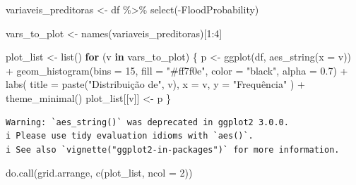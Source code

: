 \documentclass[
  letterpaper,
  DIV=11,
  numbers=noendperiod]{scrartcl}
\newenvironment{Shaded}{\begin{snugshade}}{\end{snugshade}}
\newcommand{\AttributeTok}[1]{\textcolor[rgb]{0.40,0.45,0.13}{#1}}
\newcommand{\ControlFlowTok}[1]{\textcolor[rgb]{0.00,0.23,0.31}{\textbf{#1}}}
\newcommand{\DecValTok}[1]{\textcolor[rgb]{0.68,0.00,0.00}{#1}}
\newcommand{\FloatTok}[1]{\textcolor[rgb]{0.68,0.00,0.00}{#1}}
\newcommand{\FunctionTok}[1]{\textcolor[rgb]{0.28,0.35,0.67}{#1}}
\newcommand{\NormalTok}[1]{\textcolor[rgb]{0.00,0.23,0.31}{#1}}
\newcommand{\OtherTok}[1]{\textcolor[rgb]{0.00,0.23,0.31}{#1}}
\newcommand{\SpecialCharTok}[1]{\textcolor[rgb]{0.37,0.37,0.37}{#1}}
\newcommand{\StringTok}[1]{\textcolor[rgb]{0.13,0.47,0.30}{#1}}
\begin{document}
\begin{Shaded}
\begin{Highlighting}[]
\NormalTok{variaveis\_preditoras }\OtherTok{\textless{}{-}}\NormalTok{ df }\SpecialCharTok{\%\textgreater{}\%} \FunctionTok{select}\NormalTok{(}\SpecialCharTok{{-}}\NormalTok{FloodProbability)}


\NormalTok{vars\_to\_plot }\OtherTok{\textless{}{-}} \FunctionTok{names}\NormalTok{(variaveis\_preditoras)[}\DecValTok{1}\SpecialCharTok{:}\DecValTok{4}\NormalTok{]}

\NormalTok{plot\_list }\OtherTok{\textless{}{-}} \FunctionTok{list}\NormalTok{()}
\ControlFlowTok{for}\NormalTok{ (v }\ControlFlowTok{in}\NormalTok{ vars\_to\_plot) \{}
\NormalTok{  p }\OtherTok{\textless{}{-}} \FunctionTok{ggplot}\NormalTok{(df, }\FunctionTok{aes\_string}\NormalTok{(}\AttributeTok{x =}\NormalTok{ v)) }\SpecialCharTok{+}
       \FunctionTok{geom\_histogram}\NormalTok{(}\AttributeTok{bins =} \DecValTok{15}\NormalTok{, }\AttributeTok{fill =} \StringTok{"\#ff7f0e"}\NormalTok{, }\AttributeTok{color =} \StringTok{"black"}\NormalTok{, }\AttributeTok{alpha =} \FloatTok{0.7}\NormalTok{) }\SpecialCharTok{+}
       \FunctionTok{labs}\NormalTok{(}
         \AttributeTok{title =} \FunctionTok{paste}\NormalTok{(}\StringTok{"Distribuição de"}\NormalTok{, v),}
         \AttributeTok{x =}\NormalTok{ v,}
         \AttributeTok{y =} \StringTok{"Frequência"}
\NormalTok{       ) }\SpecialCharTok{+}
       \FunctionTok{theme\_minimal}\NormalTok{()}
\NormalTok{  plot\_list[[v]] }\OtherTok{\textless{}{-}}\NormalTok{ p}
\NormalTok{\}}
\end{Highlighting}
\end{Shaded}

\begin{verbatim}
Warning: `aes_string()` was deprecated in ggplot2 3.0.0.
i Please use tidy evaluation idioms with `aes()`.
i See also `vignette("ggplot2-in-packages")` for more information.
\end{verbatim}

\begin{Shaded}
\begin{Highlighting}[]
\FunctionTok{do.call}\NormalTok{(grid.arrange, }\FunctionTok{c}\NormalTok{(plot\_list, }\AttributeTok{ncol =} \DecValTok{2}\NormalTok{))}
\end{Highlighting}
\end{Shaded}
\end{document}
